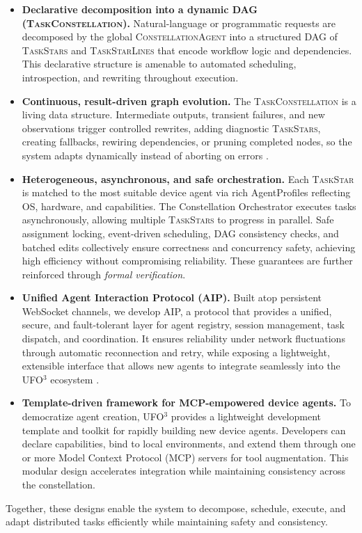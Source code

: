 \documentclass[10pt]{article} %
\newcommand{\ufo}{\textsc{UFO}$^3$\xspace}
\newcommand{\cagent}{\textsc{ConstellationAgent}\xspace}
\newcommand{\TaskConstellation}{\textsc{TaskConstellation}\xspace}
\newcommand{\TaskStar}{\textsc{TaskStar}\xspace}
\newcommand{\TaskStars}{\textsc{TaskStars}\xspace}
\newcommand{\TaskStarLines}{\textsc{TaskStarLines}\xspace}
\begin{document}
\begin{itemize}
    \item \textbf{Declarative decomposition into a dynamic DAG (\TaskConstellation).} Natural-language or programmatic requests are decomposed by the global \cagent into a structured DAG \cite{bei2025graphs} of \TaskStars and \TaskStarLines that encode workflow logic and dependencies. This declarative structure is amenable to automated scheduling, introspection, and rewriting throughout execution.

    \item \textbf{Continuous, result-driven graph evolution.} The \TaskConstellation is a living data structure. Intermediate outputs, transient failures, and new observations trigger controlled rewrites, adding diagnostic \TaskStars, creating fallbacks, rewiring dependencies, or pruning completed nodes, so the system adapts dynamically instead of aborting on errors \cite{wu2024agentkit}.

    \item \textbf{Heterogeneous, asynchronous, and safe orchestration.} Each \TaskStar is matched to the most suitable device agent via rich AgentProfiles reflecting OS, hardware,  and capabilities. The Constellation Orchestrator executes tasks asynchronously, allowing multiple \TaskStars to progress in parallel. Safe assignment locking, event-driven scheduling, DAG consistency checks, and batched edits collectively ensure correctness and concurrency safety, achieving high efficiency without compromising reliability. These guarantees are further reinforced through \emph{formal verification}.

    
    \item \textbf{Unified Agent Interaction Protocol (AIP).} Built atop persistent WebSocket channels, we develop AIP, a protocol that provides a unified, secure, and fault-tolerant layer for agent registry, session management, task dispatch, and coordination. It ensures reliability under network fluctuations through automatic reconnection and retry, while exposing a lightweight, extensible interface that allows new agents to integrate seamlessly into the \ufo ecosystem \cite{yang2025survey}.
    
    \item \textbf{Template-driven framework for MCP-empowered device agents.} To democratize agent creation, \ufo provides a lightweight development template and toolkit for rapidly building new device agents. Developers can declare capabilities, bind to local environments, and extend them through one or more Model Context Protocol (MCP) servers \cite{hou2025model} for tool augmentation. This modular design accelerates integration while maintaining consistency across the constellation.
\end{itemize}
Together, these designs enable the system to decompose, schedule, execute, and adapt distributed tasks efficiently while maintaining safety and consistency.
\end{document}
